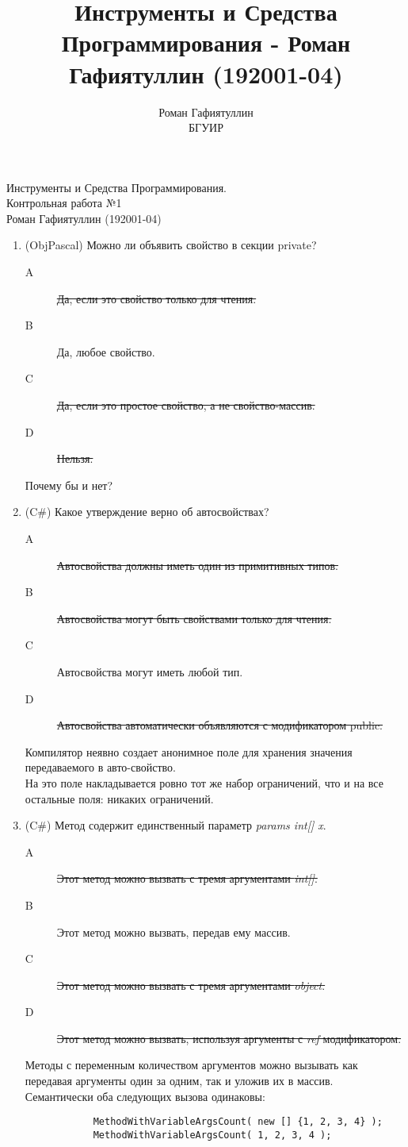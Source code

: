 \documentclass[12pt]{article}
\title{Инструменты и Средства Программирования - Роман Гафиятуллин (192001-04)}
\author{Роман Гафиятуллин\\ БГУИР}
\begin{document}
	\begin{titlepage}
		\begin{center}
			{\Large Инструменты и Средства Программирования. \\ Контрольная работа №1 \\ Роман Гафиятуллин (192001-04)}
		\end{center}
	\end{titlepage}
	\clearpage
	\begin{enumerate}
		\item (ObjPascal) Можно ли объявить свойство в секции private? 
			\begin{description}
				\item[A] \sout{Да, если это свойство только для чтения.}
				\item[B] Да, любое свойство.
				\item[C] \sout{Да, если это простое свойство, а не свойство-массив.}
				\item[D] \sout{Нельзя.}
			\end{description}
			Почему бы и нет?

		\item (C\#) Какое утверждение верно об автосвойствах? 
			\begin{description}
				\item[A] \sout{Автосвойства должны иметь один из примитивных типов.}
				\item[B] \sout{Автосвойства могут быть свойствами только для чтения.}
				\item[C] Автосвойства могут иметь любой тип.
				\item[D] \sout{Автосвойства автоматически объявляются с модификатором public.}
			\end{description}
			Компилятор неявно создает анонимное поле для хранения значения передаваемого в авто-свойство.
			\\
			На это поле накладывается ровно тот же набор ограничений, что и на все остальные поля: никаких ограничений.

		\item (C\#) Метод содержит единственный параметр \emph{params int[] x}.
			\begin{description}
				\item[A] \sout{Этот метод можно вызвать с тремя аргументами \emph{int[]}.}
				\item[B] Этот метод можно вызвать, передав ему массив.
				\item[C] \sout{Этот метод можно вызвать с тремя аргументами \emph{object}.}
				\item[D] \sout{Этот метод можно вызвать, используя аргументы с \emph{ref} модификатором.}
			\end{description}
			Методы с переменным количеством аргументов можно вызывать как передавая аргументы один за одним, так и уложив их в массив.
			\\
			Семантически оба следующих вызова одинаковы:
			\begin{verbatim}
			MethodWithVariableArgsCount( new [] {1, 2, 3, 4} );
			MethodWithVariableArgsCount( 1, 2, 3, 4 );
			\end{verbatim}



\end{enumerate}
\end{document}
